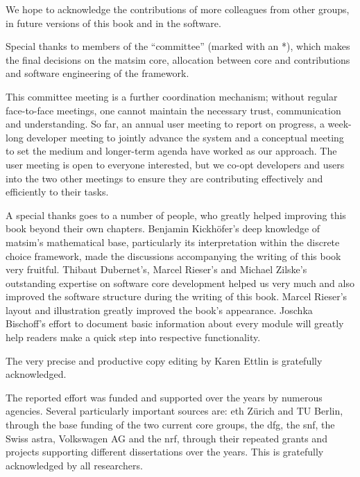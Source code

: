 % 
We hope to acknowledge the contributions of more colleagues from other groups, in future versions of this book and in the software.   

Special thanks to members of the ``committee'' (marked with an \mbox{*}), which makes the final decisions on the \gls{matsim} core, allocation between core and \glspl{contribution} and software engineering of the \gls{framework}.

This committee meeting is a further coordination mechanism; without regular face-to-face meetings, one cannot maintain the necessary trust, communication and understanding. So far, an annual user meeting to report on progress, a week-long developer meeting to jointly advance the system and a conceptual meeting to set the medium and longer-term agenda have worked as our approach. The user meeting is open to everyone interested, but we co-opt developers and users into the two other meetings to ensure they are contributing effectively and efficiently to their tasks. 

A special thanks goes to a number of people, who greatly helped improving this book beyond their own chapters.
Benjamin Kickhöfer's deep knowledge of \gls{matsim}'s mathematical base, particularly its interpretation within the discrete choice framework, made the discussions accompanying the writing of this book very fruitful. 
Thibaut Dubernet's, Marcel Rieser's and Michael Zilske's outstanding expertise on software core development helped us very much and also improved the software structure during the writing of this book.
Marcel Rieser's layout and illustration greatly improved the book's appearance.
Joschka Bischoff's effort to document basic information about every module will greatly help readers make a quick step into respective functionality.

The very precise and productive copy editing by Karen Ettlin is gratefully acknowledged. %

The reported effort was funded and supported over the years by numerous agencies. Several particularly important sources are: \gls{eth} Zürich and TU Berlin, through the base funding of the two current core groups, the \gls{dfg}, the \gls{snf}, the Swiss \gls{astra}, Volkswagen AG and the \gls{nrf}, through their repeated grants and projects supporting different dissertations over the years. This is gratefully acknowledged by all researchers. 

